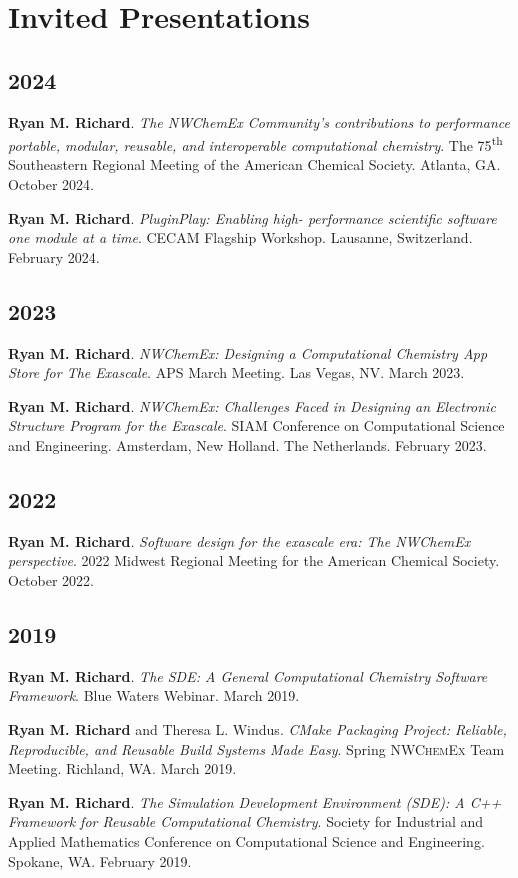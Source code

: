 \documentclass[11pt,a4paper,sans]{moderncv}
\begin{document}
\section{Invited Presentations}
\vspace{5pt}
\begin{etaremune}
    \item[]{}
	\subsection{2024}
	\item{\textbf{Ryan M. Richard}. \textit{The NWChemEx Community's contributions to performance portable, modular, reusable, and interoperable computational chemistry}. The 75\textsuperscript{th} Southeastern Regional Meeting of the American Chemical Society. Atlanta, GA. October 2024.} 
	\item{\textbf{Ryan M. Richard}. \textit{PluginPlay: Enabling high-
	      performance scientific software one module at a time}. CECAM Flagship 
		  Workshop. Lausanne, Switzerland. February 2024.}

	\subsection{2023}
	\item{\textbf{Ryan M. Richard}. \textit{NWChemEx: Designing a Computational
	      Chemistry App Store for The Exascale}. APS March Meeting. Las Vegas,
		  NV. March 2023.}
	\item{\textbf{Ryan M. Richard}. \textit{NWChemEx: Challenges Faced in
	      Designing an Electronic Structure Program for the Exascale}. SIAM
		  Conference on Computational Science and Engineering. Amsterdam, New
		  Holland. The Netherlands. February 2023.}

	\subsection{2022}
    \item{\textbf{Ryan M. Richard}. \textit{Software design for the exascale
	      era: The NWChemEx perspective}. 2022 Midwest Regional Meeting for the
		  American Chemical Society. October 2022.}

	\subsection{2019}
	\item{\textbf{Ryan M. Richard}. \textit{The SDE: A General Computational
	      Chemistry Software Framework}. Blue Waters Webinar. March 2019.}
	\item{\textbf{Ryan M. Richard} and Theresa L. Windus. \textit{CMake
	      Packaging Project: Reliable, Reproducible, and Reusable Build Systems
		  Made Easy}. Spring \textsc{NWChemEx} Team Meeting. Richland, WA.
		  March 2019.}
	\item{\textbf{Ryan M. Richard}. \textit{The Simulation Development
	      Environment (SDE): A C++ Framework for Reusable Computational
		  Chemistry}. Society for Industrial and Applied Mathematics Conference
		  on Computational Science and Engineering. Spokane, WA. February 2019.}


\end{etaremune}
\end{document}
